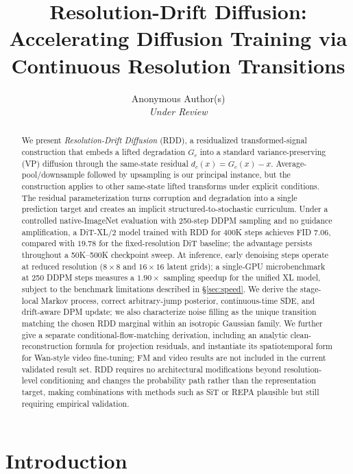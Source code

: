 \documentclass[10pt]{article}
\title{Resolution-Drift Diffusion: Accelerating Diffusion Training via\\ Continuous Resolution Transitions}
\author{
  Anonymous Author(s)\\
  \textit{Under Review}
}
\date{}
\begin{document}
\maketitle

\begin{abstract}
We present \emph{Resolution-Drift Diffusion} (RDD), a residualized transformed-signal construction that embeds a lifted degradation $G_c$ into a standard variance-preserving (VP) diffusion through the same-state residual $d_c(x)=G_c(x)-x$.
Average-pool/downsample followed by upsampling is our principal instance, but the construction applies to other same-state lifted transforms under explicit conditions.
The residual parameterization turns corruption and degradation into a single prediction target and creates an implicit structured-to-stochastic curriculum.
Under a controlled native-ImageNet evaluation with 250-step DDPM sampling and no guidance amplification, a DiT-XL/2 model trained with RDD for 400K steps achieves FID $7.06$, compared with $19.78$ for the fixed-resolution DiT baseline; the advantage persists throughout a 50K--500K checkpoint sweep.
At inference, early denoising steps operate at reduced resolution ($8{\times}8$ and $16{\times}16$ latent grids); a single-GPU microbenchmark at 250 DDPM steps measures a $1.90\times$ sampling speedup for the unified XL model, subject to the benchmark limitations described in \S\ref{sec:speed}.
We derive the stage-local Markov process, correct arbitrary-jump posterior, continuous-time SDE, and drift-aware DPM update; we also characterize noise filling as the unique transition matching the chosen RDD marginal within an isotropic Gaussian family.
We further give a separate conditional-flow-matching derivation, including an analytic clean-reconstruction formula for projection residuals, and instantiate its spatiotemporal form for Wan-style video fine-tuning; FM and video results are not included in the current validated result set.
RDD requires no architectural modifications beyond resolution-level conditioning and changes the probability path rather than the representation target, making combinations with methods such as SiT or REPA plausible but still requiring empirical validation.
\end{abstract}

\section{Introduction}
\label{sec:intro}
\end{document}

